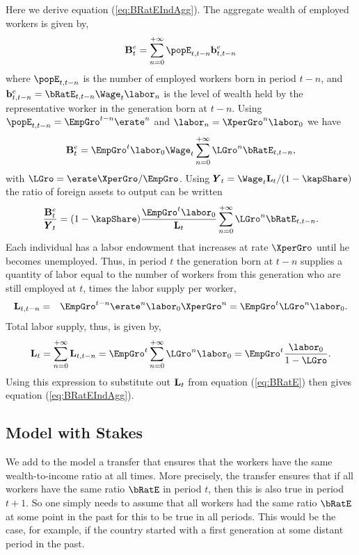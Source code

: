 \documentclass[titlepage]{\econtex}\newcommand{\texname}{cjSOE}
\renewcommand{\GDPLev}{\ensuremath{\pmb{Y}}}
\begin{document}
Here we derive equation (\ref{eq:BRatEIndAgg}). The aggregate wealth of employed workers is given by,
\begin{equation*}
\BLevE_t=\sum_{n=0}^{+\infty} \popE_{t,t-n} \bLevE_{t,t-n}
\end{equation*}
where $\popE_{t,t-n}$ is the number of employed workers born in period $t-n$, and
$\bLevE_{t,t-n}=\bRatE_{t,t-n}\Wage_t \labor_{n}$ is the level of wealth held by the representative worker in the generation born at $t-n$. Using $\popE_{t,t-n}=\EmpGro^{t-n}\erate^{n}$ and $\labor_{n}=\XperGro^{n}\labor_0$ we have
\begin{equation*}
\BLevE_t = \EmpGro^t \labor_0 \Wage_t
\sum_{n=0}^{+\infty}\LGro^{n} \bRatE_{t,t-n},
\end{equation*}
with $\LGro = \erate \XperGro / \EmpGro$.
Using $\GDPLev_t=\Wage_t \LLev_t/(1-\kapShare)$ the ratio of foreign assets to output can be written
\begin{equation}
\frac{\BLevE_t}{\GDPLev_t}=(1-\kapShare) \frac{\EmpGro^t \labor_0} {\LLev_t} \sum_{n=0}^{+\infty}\LGro^{n} \bRatE_{t,t-n}.
\label{eq:BRatE}
\end{equation}
Each individual has a labor endowment that increases at rate $\XperGro$ until he becomes unemployed. Thus, in period $t$ the generation born at $t-n$ supplies a quantity of labor equal to the number of workers from this generation who are still employed at $t$, times the labor supply per worker,
\begin{eqnarray*}
\LLev_{t,t-n} & = & \EmpGro^{t-n}\erate^{n} \labor_0 \XperGro^{n}
= \EmpGro^{t} \LGro^{n}\labor_0 .
\end{eqnarray*}
Total labor supply, thus, is given by,
\begin{equation}
\LLev_t  =  \sum_{n=0}^{+\infty}\LLev_{t,t-n}  = \EmpGro^{t} \sum_{n=0}^{+\infty} \LGro^{n} \labor_0
=\EmpGro^{t} \frac{\labor_0}{1-\LGro}.
\label{eq:LLev}
\end{equation}
Using this expression to substitute out $\mathbf{L}_t$ from equation (\ref{eq:BRatE}) then gives equation  (\ref{eq:BRatEIndAgg}).

\subsection{Model with Stakes}

We add to the model a transfer that ensures that the workers have the same wealth-to-income ratio at all times. More precisely, the transfer ensures that if all workers have the same ratio $\bRatE$ in period $t$, then this is also true in period $t+1$. So one simply needs to assume that all workers had the same ratio $\bRatE$ at some point in the past for this to be true in all periods. This would be the case, for example, if the country started with a first generation at some distant period in the past.
\end{document}
